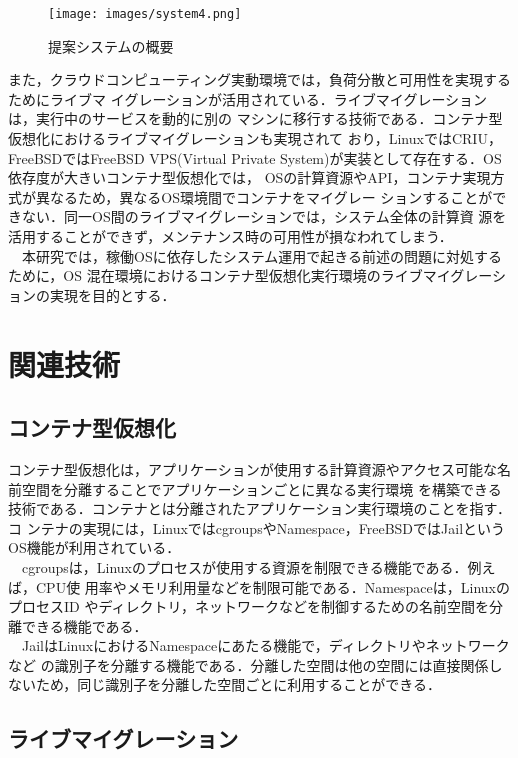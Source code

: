 \documentclass[11pt]{jarticle}
\begin{document}
\begin{figure*}[t]
  \centering
  \texttt{[image: images/system4.png]} \\
  \caption{提案システムの概要}
  \label{fig:system}
\end{figure*}

また，クラウドコンピューティング実動環境では，負荷分散と可用性を実現するためにライブマ
イグレーションが活用されている．ライブマイグレーションは，実行中のサービスを動的に別の
マシンに移行する技術である．コンテナ型仮想化におけるライブマイグレーションも実現されて
おり，LinuxではCRIU\cite{criu,container_live}，FreeBSDではFreeBSD VPS(Virtual Private
 System)\cite{freebsd-vps}が実装として存在する．OS依存度が大きいコンテナ型仮想化では，
 OSの計算資源やAPI，コンテナ実現方式が異なるため，異なるOS環境間でコンテナをマイグレー
 ションすることができない．同一OS間のライブマイグレーションでは，システム全体の計算資
 源を活用することができず，メンテナンス時の可用性が損なわれてしまう．\\
　本研究では，稼働OSに依存したシステム運用で起きる前述の問題に対処するために，OS
混在環境におけるコンテナ型仮想化実行環境のライブマイグレーションの実現を目的とする．

\section{関連技術}
\subsection{コンテナ型仮想化}
\label{sec:container}

コンテナ型仮想化は，アプリケーションが使用する計算資源やアクセス可能な名前空間を分離することでアプリケーションごとに異なる実行環境
を構築できる技術である．コンテナとは分離されたアプリケーション実行環境のことを指す．コ
ンテナの実現には，LinuxではcgroupsやNamespace，FreeBSDではJailというOS機能が利用されている．\\
　cgroupsは，Linuxのプロセスが使用する資源を制限できる機能である．例えば，CPU使
用率やメモリ利用量などを制限可能である．Namespaceは，LinuxのプロセスID
やディレクトリ，ネットワークなどを制御するための名前空間を分離できる機能である．\\
　JailはLinuxにおけるNamespaceにあたる機能で，ディレクトリやネットワークなど
の識別子を分離する機能である．分離した空間は他の空間には直接関係しないため，同じ識別子を分離した空間ごとに利用することができる．

\subsection{ライブマイグレーション}
\end{document}
